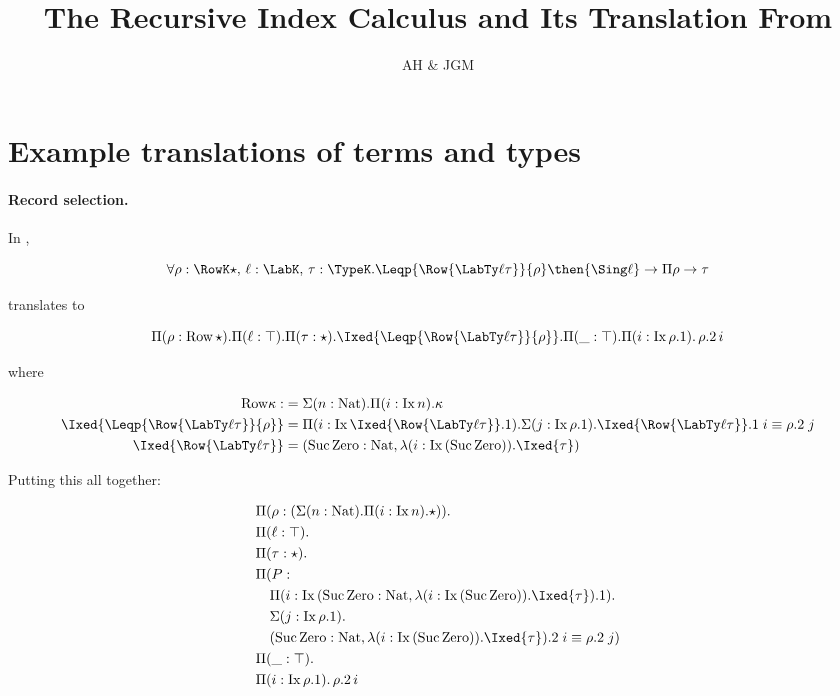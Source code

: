\documentclass[12pt]{article}
\title{The Recursive Index Calculus and Its Translation From \RO}
\author{AH \& JGM}
\newcommand\Nat{\mathrm{Nat}}
\newcommand\Zero{\mathrm{Zero}}
\newcommand\Suc{\mathrm{Suc}}
\newcommand\Ix[1]{\mathrm{Ix} \, #1}
\begin{document}
\maketitle

\section{Example translations of \RO terms and types}

\paragraph{Record selection.}
In \RO,

\[
\forall \rho : \RowK \star, \, \ell : \LabK, \, \tau : \TypeK. \Leqp {\Row {\LabTy \ell \tau}} {\rho} \then {\Sing \ell} \to {\Pi \rho} \to \tau
\]

translates to

\[
\Pi (\rho : \mathrm{Row }\, \star). \Pi (\ell : \top). \Pi (\tau : \star). \Ixed{\Leqp {\Row {\LabTy \ell \tau}} {\rho}}. \Pi (\_ : \top). \Pi (i : \Ix {\rho.1}). \, \rho.2 \, i 
\]

where

\begin{align*}
\mathrm{Row } \kappa :&= \Sigma (n : \Nat). \Pi (i : \Ix n). \kappa \\
\Ixed{\Leqp {\Row {\LabTy \ell \tau}} {\rho}} &= \Pi (i : \Ix \Ixed{\Row {\LabTy \ell \tau}}.1). \Sigma (j : \Ix {\rho.1}). \Ixed{\Row {\LabTy \ell \tau}}.1 \; i \equiv {\rho}.2 \; j \\
\Ixed{\Row {\LabTy \ell \tau}} &= (\Suc \, \Zero : \Nat, \lambda (i : \Ix {(\Suc \, \Zero)}). \Ixed{\tau})
\end{align*}

Putting this all together:

\begin{align*}
&\Pi (\rho : (\Sigma (n : \Nat). \Pi (i : \Ix n). \star)).\\ 
&\Pi (\ell : \top). \\
&\Pi (\tau : \star). \\
&\Pi (P :      \\
&\quad \Pi (i : \Ix (\Suc \, \Zero : \Nat, \lambda (i : \Ix {(\Suc \, \Zero)}). \Ixed{\tau}).1). \\
&\quad      \Sigma (j : \Ix {\rho.1}).  \\
&\quad      (\Suc \, \Zero : \Nat, \lambda (i : \Ix {(\Suc \, \Zero)}). \Ixed{\tau}).2 \; i \equiv {\rho}.2 \; j) \\
&\Pi (\_ : \top). \\
&\Pi (i : \Ix {\rho.1}). \, \rho.2 \, i 
\end{align*}
\end{document}
